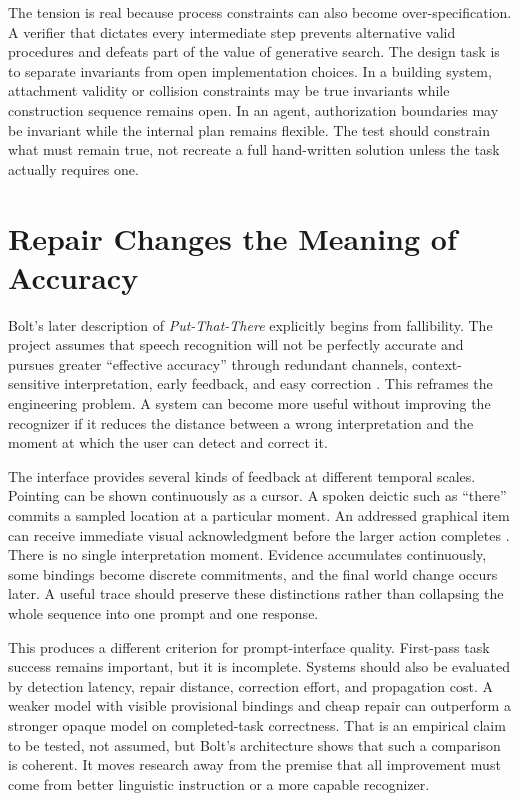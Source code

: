 \documentclass[11pt]{article}
\begin{document}
The tension is real because process constraints can also become over-specification. A verifier that dictates every intermediate step prevents alternative valid procedures and defeats part of the value of generative search. The design task is to separate invariants from open implementation choices. In a building system, attachment validity or collision constraints may be true invariants while construction sequence remains open. In an agent, authorization boundaries may be invariant while the internal plan remains flexible. The test should constrain what must remain true, not recreate a full hand-written solution unless the task actually requires one.

\section{Repair Changes the Meaning of Accuracy}

Bolt's later description of \emph{Put-That-There} explicitly begins from fallibility. The project assumes that speech recognition will not be perfectly accurate and pursues greater ``effective accuracy'' through redundant channels, context-sensitive interpretation, early feedback, and easy correction \citep{bolt1982put}. This reframes the engineering problem. A system can become more useful without improving the recognizer if it reduces the distance between a wrong interpretation and the moment at which the user can detect and correct it.

The interface provides several kinds of feedback at different temporal scales. Pointing can be shown continuously as a cursor. A spoken deictic such as ``there'' commits a sampled location at a particular moment. An addressed graphical item can receive immediate visual acknowledgment before the larger action completes \citep{bolt1980put}. There is no single interpretation moment. Evidence accumulates continuously, some bindings become discrete commitments, and the final world change occurs later. A useful trace should preserve these distinctions rather than collapsing the whole sequence into one prompt and one response.

This produces a different criterion for prompt-interface quality. First-pass task success remains important, but it is incomplete. Systems should also be evaluated by detection latency, repair distance, correction effort, and propagation cost. A weaker model with visible provisional bindings and cheap repair can outperform a stronger opaque model on completed-task correctness. That is an empirical claim to be tested, not assumed, but Bolt's architecture shows that such a comparison is coherent. It moves research away from the premise that all improvement must come from better linguistic instruction or a more capable recognizer.
\end{document}

